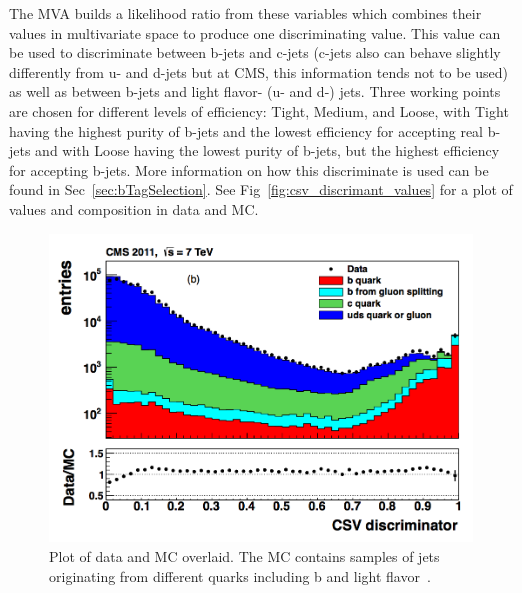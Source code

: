 	The MVA builds a likelihood ratio from these variables which combines their values in multivariate space to produce one discriminating value. This value can be used to discriminate between b-jets and c-jets (c-jets also can behave slightly differently from u- and d-jets but at CMS, this information tends not to be used) as well as between b-jets and light flavor- (u- and d-) jets. Three working points are chosen for different levels of efficiency: Tight, Medium, and Loose, with Tight having the highest purity of b-jets and the lowest efficiency for accepting real b-jets and with Loose having the lowest purity of b-jets, but the highest efficiency for accepting b-jets. More information on how this discriminate is used can be found in Sec~\ref{sec:bTagSelection}. See Fig~\ref{fig:csv_discrimant_values} for a plot of values and composition in data and MC.
	
	
\begin{figure}[h]
\begin{center}
\includegraphics[width=0.7\linewidth]{Figs/CSV_discriminator_values.png}
\caption{\label{fig:csv_discriminant_values}
Plot of data and MC overlaid. The MC contains samples of jets originating from different quarks including b and light flavor~\cite{btagging}.
}
\end{center}
\end{figure}
	
	
	
	
	
	
	
	
	
	